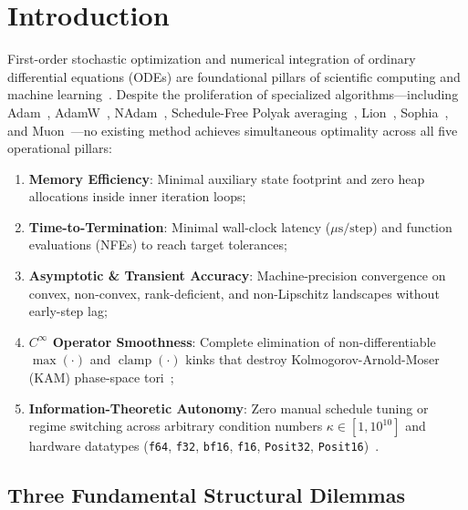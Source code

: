 \documentclass[10pt,twocolumn,letterpaper]{article}
\theoremstyle{definition}
\theoremstyle{remark}
\begin{document}
\section{Introduction}

First-order stochastic optimization and numerical integration of ordinary differential equations (ODEs) are foundational pillars of scientific computing and machine learning~\cite{robbins1951stochastic,duchi2011adaptive}. Despite the proliferation of specialized algorithms---including Adam~\cite{kingma2015adam}, AdamW~\cite{loshchilov2019decoupled}, NAdam~\cite{dozat2016incorporating}, Schedule-Free Polyak averaging~\cite{polyak1992acceleration,defazio2024road}, Lion~\cite{chen2023symbolic}, Sophia~\cite{liu2024sophia}, and Muon~\cite{jordan2024muon}---no existing method achieves simultaneous optimality across all five operational pillars:
\begin{enumerate}[leftmargin=*,nosep]
  \item \textbf{Memory Efficiency}: Minimal auxiliary state footprint and zero heap allocations inside inner iteration loops;
  \item \textbf{Time-to-Termination}: Minimal wall-clock latency ($\mu\mathrm{s}/\text{step}$) and function evaluations (NFEs) to reach target tolerances;
  \item \textbf{Asymptotic \& Transient Accuracy}: Machine-precision convergence on convex, non-convex, rank-deficient, and non-Lipschitz landscapes without early-step lag;
  \item \textbf{$C^\infty$ Operator Smoothness}: Complete elimination of non-differentiable $\max(\cdot)$ and $\operatorname{clamp}(\cdot)$ kinks that destroy Kolmogorov-Arnold-Moser (KAM) phase-space tori~\cite{hairer2006geometric};
  \item \textbf{Information-Theoretic Autonomy}: Zero manual schedule tuning or regime switching across arbitrary condition numbers $\kappa \in [1, 10^{10}]$ and hardware datatypes (\texttt{f64}, \texttt{f32}, \texttt{bf16}, \texttt{f16}, \texttt{Posit32}, \texttt{Posit16})~\cite{goldberg1991what,gustafson2017beating}.
\end{enumerate}

\subsection{Three Fundamental Structural Dilemmas}
\end{document}
